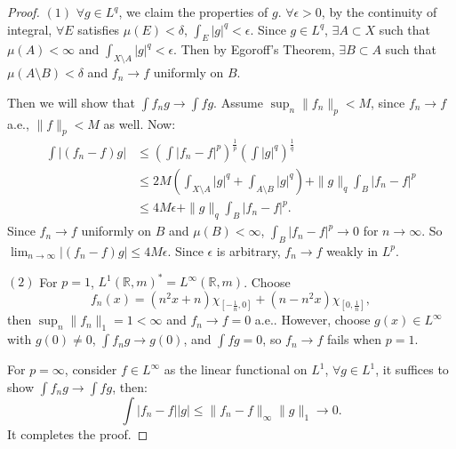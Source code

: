 \documentclass{article}
\newcommand{\norm}[1]{\|#1\|}
\begin{document}
\begin{proof}
    $(1)$ $\forall g\in L^{q}$, we claim the properties of $g$. 
    $\forall\epsilon>0$, by the continuity of integral, $\forall E$ 
    satisfies $\mu(E)<\delta$, $\int_{E}|g|^{q}<\epsilon$. Since 
    $g\in L^{q}$, $\exists A\subset X$ such that $\mu(A)<\infty$ 
    and $\int_{X\setminus A}|g|^{q}<\epsilon$. 
    Then by Egoroff's Theorem, $\exists B\subset A$ such that 
    $\mu(A\setminus B)<\delta$ and $f_{n}\rightarrow f$ uniformly 
    on $B$. 

    Then we will show that $\int f_{n}g\rightarrow\int fg$. Assume 
    $\sup_{n}\norm{f_n}_{p}<M$, since $f_n\rightarrow f$ a.e., 
    $\norm{f}_p<M$ as well. Now:
    \begin{displaymath}
        \begin{array}{rl}
            \int |(f_n-f)g|&\le\left(\int|f_{n}-f|^{p}\right)^{\frac{1}{p}}
            \left(\int |g|^{q}\right)^{\frac{1}{q}}\\
            &\le 2M(\int_{X\setminus A}|g|^{q}+\int_{A\setminus B}|g|^{q})
            +\norm{g}_{q}\int_{B}|f_n-f|^{p}\\
            &\le 4M\epsilon+\norm{g}_{q}\int_{B}|f_n-f|^{p}.
        \end{array}
    \end{displaymath}
    Since $f_{n}\rightarrow f$ uniformly on $B$ and $\mu(B)<\infty$, 
    $\int_{B}|f_n-f|^{p}\rightarrow 0$ for $n\rightarrow\infty$. 
    So $\lim_{n\rightarrow\infty}|(f_{n}-f)g|\le 4M\epsilon$. 
    Since $\epsilon$ is arbitrary, $f_{n}\rightarrow f$ weakly in $L^{p}$.

    $(2)$ For $p=1$, $L^{1}(\mathbb{R},m)^{*}=L^{\infty}(\mathbb{R},m)$. 
    Choose 
    \begin{displaymath}
        f_{n}(x)=(n^2x+n)\chi_{[-\frac{1}{n},0]}+(n-n^2x)
        \chi_{[0,\frac{1}{n}]},    
    \end{displaymath}
    then $\sup_{n}\norm{f_n}_{1}=1<\infty$ and $f_{n}\rightarrow f=0$ 
    a.e.. 
    However, choose $g(x)\in L^{\infty}$ with $g(0)\neq 0$, 
    $\int f_{n}g\rightarrow g(0)$, and $\int fg=0$, 
    so $f_{n}\rightarrow f$ fails when $p=1$.

    For $p=\infty$, consider $f\in L^{\infty}$ as the linear functional 
    on $L^{1}$, $\forall g\in L^{1}$, it suffices to show 
    $\int f_{n}g\rightarrow\int fg$, then:
    \begin{displaymath}
        \int |f_{n}-f||g|\le\norm{f_{n}-f}_{\infty}\norm{g}_{1}
        \rightarrow 0.
    \end{displaymath}
    It completes the proof.
\end{proof}
\end{document}
